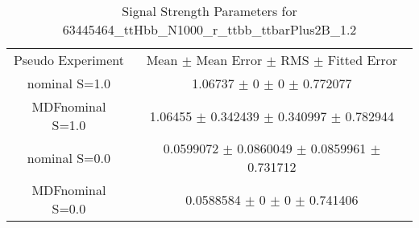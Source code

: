 \begin{table}
\centering
\caption{Signal Strength Parameters for 63445464\_ttHbb\_N1000\_r\_ttbb\_ttbarPlus2B\_1.2}
\begin{tabular}{cc}
\toprule
Pseudo Experiment & Mean $\pm$ Mean Error $\pm$ RMS $\pm$ Fitted Error\\
nominal S=1.0 & \num{1.06737} $\pm$ \num{0} $\pm$ \num{0} $\pm$ \num{0.772077}\\
MDFnominal S=1.0 & \num{1.06455} $\pm$ \num{0.342439} $\pm$ \num{0.340997} $\pm$ \num{0.782944}\\
nominal S=0.0 & \num{0.0599072} $\pm$ \num{0.0860049} $\pm$ \num{0.0859961} $\pm$ \num{0.731712}\\
MDFnominal S=0.0 & \num{0.0588584} $\pm$ \num{0} $\pm$ \num{0} $\pm$ \num{0.741406}\\
\bottomrule
\end{tabular}
\end{table}